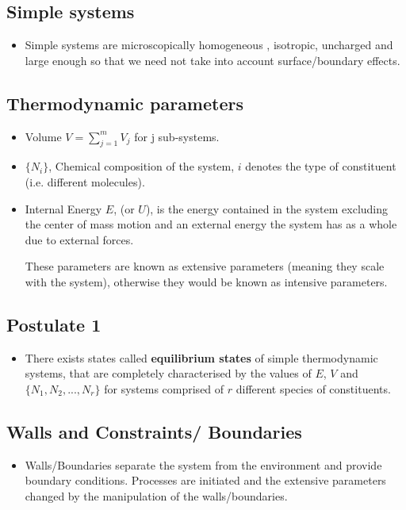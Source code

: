 \documentclass[11pt]{article}
\numberwithin{equation}{section}
\numberwithin{equation}{section}
\begin{document}
\subsection{Simple systems}
\begin{itemize}
    \item Simple systems are microscopically homogeneous , isotropic, uncharged and large enough so that we need not take into account surface/boundary effects. 
\end{itemize}

\subsection{Thermodynamic parameters}
\begin{itemize}
    \item Volume $V=\sum_{j=1}^mV_j$ for j sub-systems.
    \item $\{ N_i \}$, Chemical composition of the system, $i$ denotes the type of constituent (i.e. different molecules). 
    \item Internal Energy $E$, (or $U$), is the energy contained in the system excluding the center of mass motion and an external energy the system has as a whole due to external forces. 

These parameters are known as extensive parameters (meaning they scale with the system), otherwise they would be known as intensive parameters. 
\end{itemize}

\subsection{Postulate 1}
\begin{itemize}
    \item There exists states called \textbf{equilibrium states} of simple thermodynamic systems, that are completely characterised by the values of $E$, $V$ and $\{ N_1, N_2,...,N_r \}$ for systems comprised of $r$ different species of constituents. 

\end{itemize}

\subsection{Walls and Constraints/ Boundaries}
\begin{itemize}
    \item Walls/Boundaries separate the system from the environment and provide boundary conditions. 
Processes are initiated and the extensive parameters changed by the manipulation of the walls/boundaries. 
\end{itemize}
\end{document}
